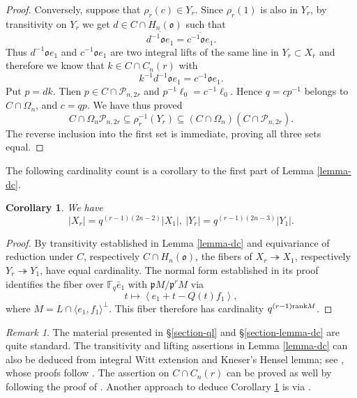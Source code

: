 \documentclass[12pt]{amsart}
\newtheorem{corollary}[theorem]{Corollary}%
\theoremstyle{definition}
\theoremstyle{remark}
\newtheorem{remark}{Remark}
\begin{document}
\begin{proof}
Conversely, suppose that $\rho_r(c)\in Y_r$. Since $\rho_r(1)$ is also in $Y_r$, by transitivity on $Y_r$ we get $d\in C\cap H_n(\mathfrak o)$ such that
\[
\overline{d^{-1}\mathfrak o e_1}
=\overline{c^{-1}\mathfrak o e_1}.
\]
Thus
$d^{-1}\mathfrak o e_1$ and $c^{-1}\mathfrak o e_1$
are two integral lifts of the same line in $Y_r \subset X_r$ and therefore we know that $k\in C\cap C_n(r)$ with
\[
k^{-1}d^{-1}\mathfrak o e_1=c^{-1}\mathfrak o e_1.
\]
Put $p=dk$. Then
$
p\in C\cap\mathcal P_{n,2r}$ and $
p^{-1}\ell_0=c^{-1}\ell_0$.
Hence $q=cp^{-1}$ belongs to $C\cap \Omega_n$, and $c=qp$. We have thus proved
\[
C\cap \Omega_n\mathcal P_{n,2r}
\subseteq\rho_r^{-1}(Y_r)
\subseteq(C\cap \Omega_n)(C\cap\mathcal P_{n,2r}).
\]
The reverse inclusion into the first set is immediate, proving all three sets equal.
\end{proof}

The following cardinality count is a corollary to the first part of Lemma \ref{lemma-dc}.
\begin{corollary}\label{coro-fiber}
We have
\[
|X_r| = q^{(r-1)(2n-2)}|X_1|, ~
|Y_r|=q^{(r-1)(2n-3)}|Y_1|.
\]
\end{corollary}

\begin{proof}
By transitivity established in Lemma \ref{lemma-dc} and equivariance of reduction under $C$, respectively $C \cap H_n(\mathfrak o)$, the fibers of $X_r \twoheadrightarrow X_1$, respectively $Y_r\twoheadrightarrow Y_1$,  have equal cardinality. The normal form established in its proof identifies the fiber over $\mathbb F_q\bar e_1$ with
$\mathfrak pM/\mathfrak p^rM$ via
\[
t\longmapsto \left\langle e_1+t-Q(t)f_1\right\rangle,
\]
where $M = L \cap \langle e_1,f_1\rangle^\perp$. This fiber therefore has cardinality $q^{(r-1) {\rm rank}M}$.
\end{proof}

\begin{remark}\label{kneser}
The material presented in \S \ref{section-ql} and \S \ref{section-lemma-dc} are quite standard. The transitivity and lifting assertions in Lemma \ref{lemma-dc} can also be deduced from integral Witt extension and Kneser’s Hensel lemma; see \cite[Theorem 1.43 and Theorem 5.15]{sch21}, whose proofs follow \cite{kne02}. The assertion on $C \cap C_n(r)$ can be proved as well by following the proof of \cite[Theorem 1.43]{sch21}. Another approach to deduce Corollary \ref{coro-fiber} is via \cite[Lemma 8.26]{sch21}.
\end{remark}
\end{document}
